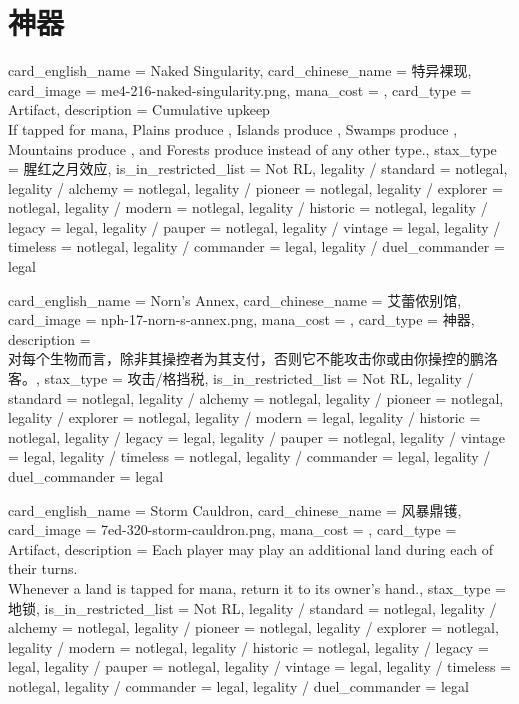 \documentclass[lang = cn, color = black, 10pt]{AllThatStax}
\begin{document}
\section{神器}

\card
{
	card_english_name = {Naked Singularity},
	card_chinese_name = {特异裸现},
	card_image = me4-216-naked-singularity.png,
	mana_cost = ,
	card_type = Artifact,
	description = {Cumulative upkeep  \\
		If tapped for mana, Plains produce , Islands produce , Swamps produce , Mountains produce , and Forests produce  instead of any other type.},
	stax_type = 腥红之月效应,
	is_in_restricted_list = Not RL,
	legality / standard = notlegal,
	legality / alchemy = notlegal,
	legality / pioneer = notlegal,
	legality / explorer = notlegal,
	legality / modern = notlegal,
	legality / historic = notlegal,
	legality / legacy = legal,
	legality / pauper = notlegal,
	legality / vintage = legal,
	legality / timeless = notlegal,
	legality / commander = legal,
	legality / duel_commander = legal
}

\card
{
	card_english_name = {Norn's Annex},
	card_chinese_name = {艾蕾侬别馆},
	card_image = nph-17-norn-s-annex.png,
	mana_cost = ,
	card_type = 神器,
	description = {\\
		对每个生物而言，除非其操控者为其支付，否则它不能攻击你或由你操控的鹏洛客。},
	stax_type = 攻击/格挡税,
	is_in_restricted_list = Not RL,
	legality / standard = notlegal,
	legality / alchemy = notlegal,
	legality / pioneer = notlegal,
	legality / explorer = notlegal,
	legality / modern = legal,
	legality / historic = notlegal,
	legality / legacy = legal,
	legality / pauper = notlegal,
	legality / vintage = legal,
	legality / timeless = notlegal,
	legality / commander = legal,
	legality / duel_commander = legal
}

\card
{
	card_english_name = {Storm Cauldron},
	card_chinese_name = {风暴鼎镬},
	card_image = 7ed-320-storm-cauldron.png,
	mana_cost = ,
	card_type = Artifact,
	description = {Each player may play an additional land during each of their turns.\\
		Whenever a land is tapped for mana, return it to its owner's hand.},
	stax_type = 地锁,
	is_in_restricted_list = Not RL,
	legality / standard = notlegal,
	legality / alchemy = notlegal,
	legality / pioneer = notlegal,
	legality / explorer = notlegal,
	legality / modern = notlegal,
	legality / historic = notlegal,
	legality / legacy = legal,
	legality / pauper = notlegal,
	legality / vintage = legal,
	legality / timeless = notlegal,
	legality / commander = legal,
	legality / duel_commander = legal
}
\end{document}
